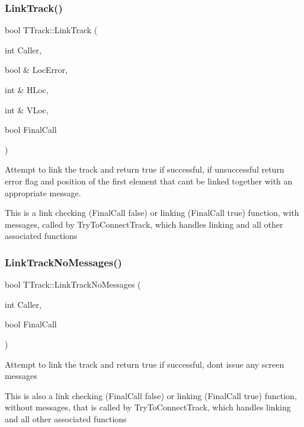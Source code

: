 \subsubsection{\texorpdfstring{Link\+Track()}{LinkTrack()}}
{\footnotesize\ttfamily bool T\+Track\+::\+Link\+Track (\begin{DoxyParamCaption}\item[{int}]{Caller,  }\item[{bool \&}]{Loc\+Error,  }\item[{int \&}]{H\+Loc,  }\item[{int \&}]{V\+Loc,  }\item[{bool}]{Final\+Call }\end{DoxyParamCaption})}

Attempt to link the track and return true if successful, if unsuccessful return error flag and position of the first element that can\textquotesingle{}t be linked together with an appropriate message.

This is a link checking (Final\+Call false) or linking (Final\+Call true) function, with messages, called by Try\+To\+Connect\+Track, which handles linking and all other associated functions \mbox{\label{class_t_track_a42f410832651458a4a34769ef95be51b}} 
\subsubsection{\texorpdfstring{Link\+Track\+No\+Messages()}{LinkTrackNoMessages()}}
{\footnotesize\ttfamily bool T\+Track\+::\+Link\+Track\+No\+Messages (\begin{DoxyParamCaption}\item[{int}]{Caller,  }\item[{bool}]{Final\+Call }\end{DoxyParamCaption})}

Attempt to link the track and return true if successful, don\textquotesingle{}t issue any screen messages

This is also a link checking (Final\+Call false) or linking (Final\+Call true) function, without messages, that is called by Try\+To\+Connect\+Track, which handles linking and all other associated functions \mbox{\label{class_t_track_abff18c1d577e257279c816da8868f232}} 
